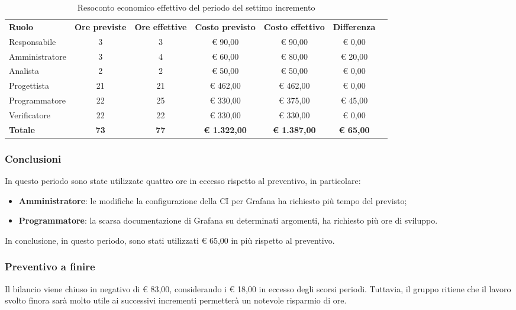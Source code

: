 \documentclass[../piano-di-progetto.tex]{subfiles}
\begin{document}
  \begin{table}[H]
    \centering
    \begin{tabular}{lcccccc}
      \rowcolor{lightgray}
      \textbf{Ruolo}  & \textbf{Ore previste} & \textbf{Ore effettive} & \textbf{Costo previsto} & \textbf{Costo effettivo} & \textbf{Differenza} \\
Responsabile    & 3           & 3           & € 90,00             & € 90,00             & € 0,00           \\
Amministratore  & 3           & 4           & € 60,00             & € 80,00             & € 20,00          \\
Analista        & 2           & 2           & € 50,00             & € 50,00             & € 0,00           \\
Progettista     & 21          & 21          & € 462,00            & € 462,00            & € 0,00           \\
Programmatore   & 22          & 25          & € 330,00            & € 375,00            & € 45,00          \\
Verificatore    & 22          & 22          & € 330,00            & € 330,00            & € 0,00           \\
\textbf{Totale} & \textbf{73} & \textbf{77} & \textbf{€ 1.322,00} & \textbf{€ 1.387,00} & \textbf{€ 65,00}
    \end{tabular}
    \caption{Resoconto economico effettivo del periodo del settimo incremento}
  \end{table}


\subsubsection{Conclusioni}
In questo periodo sono state utilizzate quattro ore in eccesso rispetto al preventivo, in particolare:
\begin{itemize}
    \item \textbf{Amministratore}: le modifiche la configurazione della CI per Grafana ha richiesto più tempo del previsto;
    \item \textbf{Programmatore}: la scarsa documentazione di Grafana su determinati argomenti, ha richiesto più ore di sviluppo.
\end{itemize}
In conclusione, in questo periodo, sono stati utilizzati € 65,00 in più rispetto al preventivo.

\subsubsection{Preventivo a finire}
Il bilancio viene chiuso in negativo di € 83,00, considerando i € 18,00 in eccesso degli scorsi periodi. Tuttavia, il gruppo ritiene che il lavoro svolto finora sarà molto utile ai successivi incrementi permetterà un notevole risparmio di ore.
\end{document}
